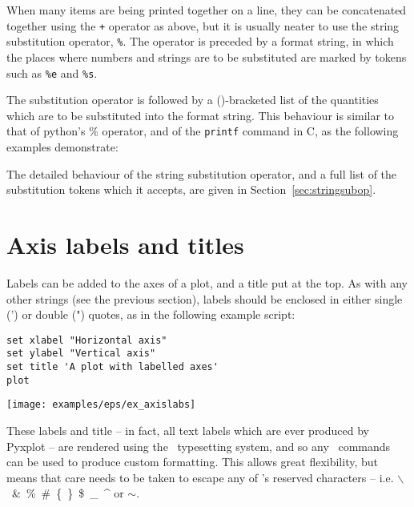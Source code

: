 When many items are being printed together on a line, they can be concatenated
together using the {\tt +} operator as above, but it is usually neater to use
the string substitution operator, {\tt \%}.  The operator is preceded by a
format string, in which the places where numbers and strings are to be
substituted are marked by tokens such as {\tt \%e} and {\tt \%s}.

The substitution operator is followed by a ()-bracketed list of the quantities
which are to be substituted into the format string. This behaviour is similar
to that of python's \% operator, and of the {\tt printf} command in C, as the
following examples demonstrate:

\vspace{3mm}

\vspace{3mm}

The detailed behaviour of the string substitution operator, and a full list of
the substitution tokens which it accepts, are given in
Section~\ref{sec:stringsubop}.

\section{Axis labels and titles}
\label{sec:latex_incompatibility}

Labels can be added to the axes of a plot, and a title put at the top. As with
any other strings (see the previous section), labels should be enclosed in
either single (') or double (") quotes, as in the following example script:

\begin{verbatim}
set xlabel "Horizontal axis"
set ylabel "Vertical axis"
set title 'A plot with labelled axes'
plot
\end{verbatim}

\begin{center}
\texttt{[image: examples/eps/ex\_axislabs]}
\end{center}

\noindent These labels and title -- in fact, all text labels which are ever
produced by Pyxplot -- are rendered using the \latexdcf\ typesetting system, and
so any \latexdcf\ commands can be used to produce custom formatting. This allows
great flexibility, but means that care needs to be taken to escape any of
\latexdcf's reserved characters -- i.e. $\backslash$~\&~\%~\#~\{~\}~\$~\_~\^{} or
$\sim$.

